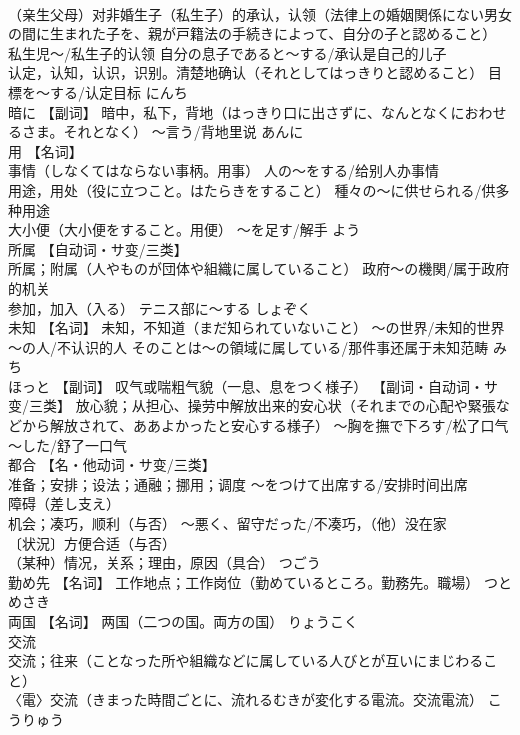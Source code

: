 \documentclass[8pt]{extreport}
\begin{document}
\begin{CJK}{UTF8}{min}
\\	（亲生父母）对非婚生子（私生子）的承认，认领（法律上の婚姻関係にない男女の間に生まれた子を、親が戸籍法の手続きによって、自分の子と認めること） 私生児～/私生子的认领 自分の息子であると～する/承认是自己的儿子 
\\	认定，认知，认识，识别。清楚地确认（それとしてはっきりと認めること） 目標を～する/认定目标	にんち	
\\	暗に	【副词】 暗中，私下，背地（はっきり口に出さずに、なんとなくにおわせるさま。それとなく） ～言う/背地里说	あんに	
\\	用	【名词】 
\\	事情（しなくてはならない事柄。用事） 人の～をする/给别人办事情 
\\	用途，用处（役に立つこと。はたらきをすること） 種々の～に供せられる/供多种用途 
\\	大小便（大小便をすること。用便） ～を足す/解手	よう	
\\	所属	【自动词・サ变/三类】 
\\	所属；附属（人やものが団体や組織に属していること） 政府～の機関/属于政府的机关 
\\	参加，加入（入る） テニス部に～する	しょぞく	
\\	未知	【名词】 未知，不知道（まだ知られていないこと） ～の世界/未知的世界 ～の人/不认识的人 そのことは～の領域に属している/那件事还属于未知范畴	みち	
\\	ほっと	【副词】 叹气或喘粗气貌（一息、息をつく様子） 【副词・自动词・サ变/三类】 放心貌；从担心、操劳中解放出来的安心状（それまでの心配や緊張などから解放されて、ああよかったと安心する様子） ～胸を撫で下ろす/松了口气 ～した/舒了一口气		
\\	都合	【名・他动词・サ变/三类】 
\\	准备；安排；设法；通融；挪用；调度 ～をつけて出席する/安排时间出席 
\\	障碍（差し支え） 
\\	机会；凑巧，顺利（与否） ～悪く、留守だった/不凑巧，（他）没在家 
\\	〔状況〕方便合适（与否） 
\\	（某种）情况，关系；理由，原因（具合）	つごう	
\\	勤め先	【名词】 工作地点；工作岗位（勤めているところ。勤務先。職場）	つとめさき	
\\	両国	【名词】 两国（二つの国。両方の国）	りょうこく	
\\	交流	
\\	交流；往来（ことなった所や組織などに属している人びとが互いにまじわること） 
\\	〈電〉交流（きまった時間ごとに、流れるむきが変化する電流。交流電流）	こうりゅう	

\end{CJK}
\end{document}
